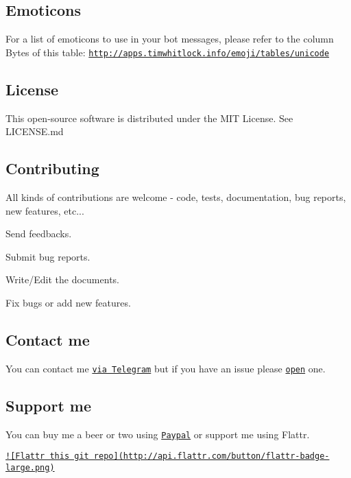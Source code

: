 \subsection*{Emoticons }

For a list of emoticons to use in your bot messages, please refer to the column Bytes of this table\-: \href{http://apps.timwhitlock.info/emoji/tables/unicode}{\tt http\-://apps.\-timwhitlock.\-info/emoji/tables/unicode}

\subsection*{License }

This open-\/source software is distributed under the M\-I\-T License. See L\-I\-C\-E\-N\-S\-E.\-md

\subsection*{Contributing }

All kinds of contributions are welcome -\/ code, tests, documentation, bug reports, new features, etc...


\begin{DoxyItemize}
\item Send feedbacks.
\item Submit bug reports.
\item Write/\-Edit the documents.
\item Fix bugs or add new features.
\end{DoxyItemize}

\subsection*{Contact me }

You can contact me \href{https://telegram.me/ggrillo}{\tt via Telegram} but if you have an issue please \href{https://github.com/Eleirbag89/TelegramBotPHP/issues}{\tt open} one.

\subsection*{Support me }

You can buy me a beer or two using \href{https://paypal.me/eleirbag89}{\tt Paypal} or support me using Flattr.

\href{https://flattr.com/submit/auto?user_id=eleirbag89&url=https://github.com/Eleirbag89/TelegramBotPHP&title=TelegramBotPHP&language=&tags=github&category=software}{\tt !\mbox{[}Flattr this git repo\mbox{]}(http\-://api.\-flattr.\-com/button/flattr-\/badge-\/large.\-png)} 